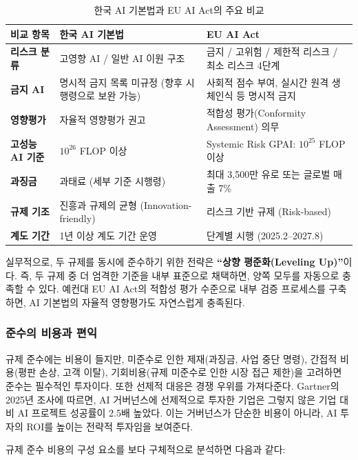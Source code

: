 \begin{table}[htbp]
\centering
\caption{한국 AI 기본법과 EU AI Act의 주요 비교}
\label{tab:korea_eu_comparison}
\begin{tabularx}{\textwidth}{|l|X|X|}
\hline
\textbf{비교 항목} & \textbf{한국 AI 기본법} & \textbf{EU AI Act} \\ \hline
\textbf{리스크 분류} & 고영향 AI / 일반 AI 이원 구조 & 금지 / 고위험 / 제한적 리스크 / 최소 리스크 4단계 \\ \hline
\textbf{금지 AI} & 명시적 금지 목록 미규정 (향후 시행령으로 보완 가능) & 사회적 점수 부여, 실시간 원격 생체인식 등 명시적 금지 \\ \hline
\textbf{영향평가} & 자율적 영향평가 권고 & 적합성 평가(Conformity Assessment) 의무 \\ \hline
\textbf{고성능 AI 기준} & $10^{26}$ FLOP 이상 & Systemic Risk GPAI: $10^{25}$ FLOP 이상 \\ \hline
\textbf{과징금} & 과태료 (세부 기준 시행령) & 최대 3,500만 유로 또는 글로벌 매출 7\% \\ \hline
\textbf{규제 기조} & 진흥과 규제의 균형 (Innovation-friendly) & 리스크 기반 규제 (Risk-based) \\ \hline
\textbf{계도 기간} & 1년 이상 계도 기간 운영 & 단계별 시행 (2025.2--2027.8) \\ \hline
\end{tabularx}
\end{table}

실무적으로, 두 규제를 동시에 준수하기 위한 전략은 \textbf{``상향 평준화(Leveling Up)''}이다. 즉, 두 규제 중 더 엄격한 기준을 내부 표준으로 채택하면, 양쪽 모두를 자동으로 충족할 수 있다. 예컨대 EU AI Act의 적합성 평가 수준으로 내부 검증 프로세스를 구축하면, AI 기본법의 자율적 영향평가도 자연스럽게 충족된다.

\subsubsection*{준수의 비용과 편익}
규제 준수에는 비용이 들지만, 미준수로 인한 제재(과징금, 사업 중단 명령), 간접적 비용(평판 손상, 고객 이탈), 기회비용(규제 미준수로 인한 시장 접근 제한)을 고려하면 준수는 필수적인 투자이다. 또한 선제적 대응은 경쟁 우위를 가져다준다. Gartner의 2025년 조사에 따르면, AI 거버넌스에 선제적으로 투자한 기업은 그렇지 않은 기업 대비 AI 프로젝트 성공률이 2.5배 높았다. 이는 거버넌스가 단순한 비용이 아니라, AI 투자의 ROI를 높이는 전략적 투자임을 보여준다.

규제 준수 비용의 구성 요소를 보다 구체적으로 분석하면 다음과 같다:


